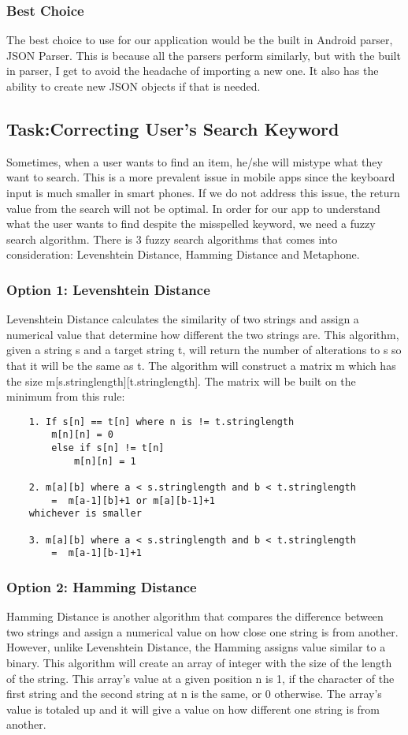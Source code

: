 \documentclass[journal,compsoc, 10pt, draftclsnofoot, onecolumn]{IEEEtran}
\begin{document}
\subsubsection{Best Choice}
The best choice to use for our application would be the built in Android parser,
JSON Parser. This is because all the parsers perform similarly, but with the
built in parser, I get to avoid the headache of importing a new one. It also has
the ability to create new JSON objects if that is needed.

\subsection{Task:Correcting User's Search Keyword}
Sometimes, when a user wants to find an item, he/she will mistype what they want to search. This is a more prevalent issue in mobile apps since the keyboard input is much smaller in smart phones. If we do not address this issue, the return value from the search will not be optimal. In order for our app to understand what the user wants to find despite the misspelled keyword, we need a fuzzy search algorithm. 
There is 3 fuzzy search algorithms that comes into consideration: Levenshtein Distance, Hamming Distance and Metaphone.

\subsubsection{Option 1: Levenshtein Distance}
Levenshtein Distance calculates the similarity of two strings and assign a numerical value that determine how different the two strings are. This algorithm, given a string s and a target string t, will return the number of alterations to s so that it will be the same as t. The algorithm will construct a matrix m which has the size m[s.stringlength][t.stringlength]. The matrix will be built on the minimum from this rule:

\begin{lstlisting}
	1. If s[n] == t[n] where n is != t.stringlength 
		m[n][n] = 0 
		else if s[n] != t[n] 
			m[n][n] = 1
	
	2. m[a][b] where a < s.stringlength and b < t.stringlength 
		=  m[a-1][b]+1 or m[a][b-1]+1 
	whichever is smaller
	
	3. m[a][b] where a < s.stringlength and b < t.stringlength 
		=  m[a-1][b-1]+1
\end{lstlisting}

\subsubsection{Option 2: Hamming Distance}
Hamming Distance is another algorithm that compares the difference between two strings and assign a numerical value on how close one string is from another. However, unlike Levenshtein Distance, the Hamming assigns value similar to a binary. This algorithm will create an array of integer with the size of the length of the string. This array’s value at a given position n is 1, if the character of the first string and the second string at n is the same, or 0 otherwise. The array’s value is totaled up and it will give a value on how different one string is from another.
\end{document}
